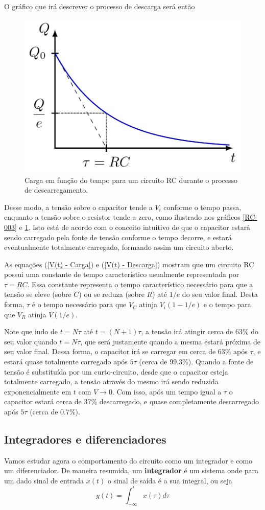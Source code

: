 \documentclass[letterpaper, 12pt]{article}
\begin{document}
O gráfico que irá descrever o processo de descarga será então
\begin{figure}[h]
    \centering
    \includegraphics[width=0.5\linewidth]{figures/RC-004.png}
    \caption{Carga em função do tempo para um circuito RC durante o processo de descarregamento.}
    \label{RC-004}
\end{figure}

Desse modo, a tensão sobre o capacitor tende a $V_{i}$ conforme o tempo passa, enquanto a tensão sobre o resistor tende a zero, como ilustrado nos gráficos \ref{RC-003} e \ref{RC-004}. Isto está de acordo com o conceito intuitivo de que o capacitor estará sendo carregado pela fonte de tensão conforme o tempo decorre, e estará eventualmente totalmente carregado, formando assim um circuito aberto.

As equações (\ref{V(t) - Carga}) e (\ref{V(t) - Descarga}) mostram que um circuito RC possui uma constante de tempo característico usualmente representada por $\tau=RC$. Essa constante representa o tempo característico necessário para que a tensão se eleve (sobre $C$) ou se reduza (sobre $R$) até $1/e$ do seu valor final. Desta forma, $\tau$ é o tempo necessário para que $V_{C}$ atinja $V_{i}(1-1/e)$ e o tempo para que $V_{R}$ atinja $V(1/e)$.

Note que indo de $t=N\tau$ até $t=(N+1)\tau$, a tensão irá atingir cerca de 63\% do seu valor quando $t=N\tau$, que será justamente quando a mesma estará próxima de seu valor final. Dessa forma, o capacitor irá se carregar em cerca de 63\% após $\tau$, e estará quase totalmente carregado após $5\tau$ (cerca de 99.3\%). Quando a fonte de tensão é substituída por um curto-circuito, desde que o capacitor esteja totalmente carregado, a tensão através do mesmo irá sendo reduzida exponencialmente em $t$ com $V\rightarrow0$. Com isso, após um tempo igual a $\tau$ o capacitor estará cerca de 37\% descarregado, e quase completamente descarregado após $5\tau$ (cerca de 0.7\%). 


\subsection{Integradores e diferenciadores}\label{subseção 2.2}
Vamos estudar agora o comportamento do circuito como um integrador e como um diferenciador. De maneira resumida, um {\bf integrador} é um sistema onde para um dado sinal de entrada $x(t)$ o sinal de saída é a sua integral, ou seja
\begin{equation}\label{Integrador}
    y(t)=\int_{-\infty}^{t}x(\tau)d\tau
\end{equation}
\end{document}

